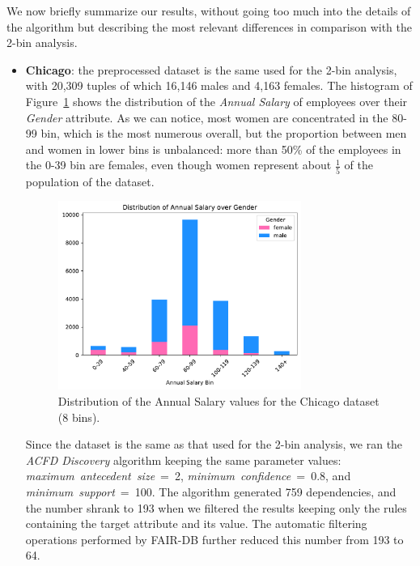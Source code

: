 We now briefly summarize our results, without going too much into the details of the algorithm but describing the most relevant differences in comparison with the 2-bin analysis.

\begin{itemize}
\item \textbf{Chicago}: the preprocessed dataset is the same used for the 2-bin analysis, with 20,309 tuples of which 16,146 males and 4,163 females. The histogram of Figure~\ref{fig:chicago_8bins_fair-db1} shows the distribution of the \textit{Annual Salary} of employees over their \textit{Gender} attribute. As we can notice, most women are concentrated in the 80-99 bin, which is the most numerous overall, but the proportion between men and women in lower bins is unbalanced: more than 50\% of the employees in the 0-39 bin are females, even though women represent about \(\frac{1}{5}\) of the population of the dataset.

\begin{figure}[t!]
\centering
\includegraphics[width=0.75\textwidth]{figures/chicago_annual_salary_over_gender.pdf}
\caption{Distribution of the \textrm{Annual Salary} values for the Chicago dataset (8 bins).}
\label{fig:chicago_8bins_fair-db1}
\end{figure}

Since the dataset is the same as that used for the 2-bin analysis, we ran the \textit{ACFD Discovery} algorithm keeping the same parameter values: \textit{maximum~antecedent~size}~=~2, \textit{minimum~confidence}~=~0.8, and \textit{minimum~support}~=~100. The algorithm generated 759 dependencies, and the number shrank to 193 when we filtered the results keeping only the rules containing the target attribute and its value. The automatic filtering operations performed by FAIR-DB further reduced this number from 193 to 64.


\end{itemize}
